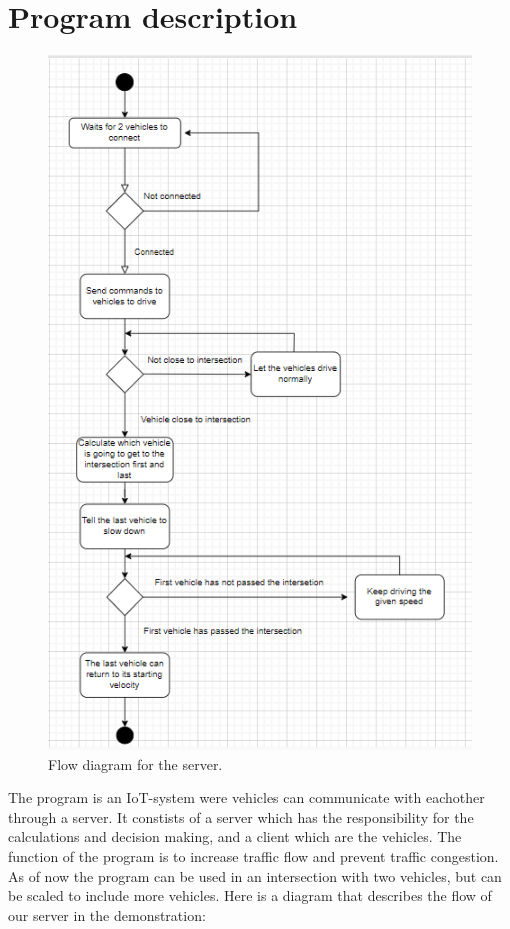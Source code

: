 \section{Program description}

\begin{figure}[h!]
	\centering
	\includegraphics[width=1\linewidth]{figures/Flow_diagram_server}
	\caption[Flow diagram server]{Flow diagram for the server.}
	\label{fig:diagramserver}
\end{figure}

The program is an IoT-system were vehicles can communicate with eachother through a server. It constists of a server which has the responsibility for the calculations and decision making, and a client which are the vehicles. The function of the program is to increase traffic flow and prevent traffic congestion. As of now the program can be used in an intersection with two vehicles, but can be scaled to include more vehicles. Here is a diagram that describes the flow of our server in the demonstration:



